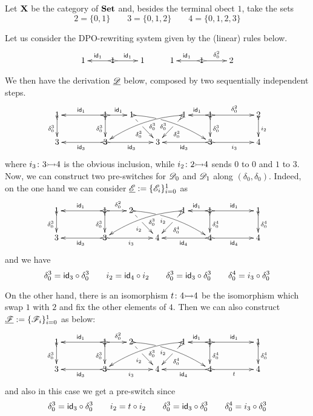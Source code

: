 \begin{example}\label{ex:abs}
	Let $\textbf {\textup{X}}$ be the category of $\textbf {\textup{Set}}$ and, besides the terminal obect $1$, take the sets
	\[2=\{0,1\} \qquad 3=\{0,1,2\} \qquad 4=\{0,1,2,3\}\]
	
Let us consider the DPO-rewriting system given by the (linear) rules below.
		\[\xymatrix{1 & 1\ar@{>->}[l]_{\id{1}} \ar@{>->}[r]^{\id{1}} & 1 & 1 & 1\ar@{>->}[r]^{\delta^2_0} \ar@{>->}[l]_{\id{1}} & 2}\]

We then have the derivation $\underline{\mathscr{D}}$ below, composed by two sequentially independent steps.
		\[\xymatrix@R=20pt@C=20pt{1 \ar@{>->}[d]_{\delta^3_0}&& 1
	\ar@{>->}[d]_{\delta^3_0}\ar@{>->}[ll]_{\id{1}} \ar@{>->}[r]^{\id{1}} & 1
	\ar@{>->}@/^.25cm/[drrr]|(.32)\hole_(.4){\delta^3_0}
	\ar[dr]|(.33)\hole_{\delta^3_0} && 1 \ar@{>->}@/_.25cm/[dlll]^(.4){\delta^3_0}
	\ar@{>->}[dl]|(.33)\hole^{\delta^3_0}& 1 \ar@{>->}[d]^{\delta^3_0}\ar@{>->}[l]_{\id{1}}
	\ar@{>->}[rr]^{\delta^2_0} && 2 \ar@{>->}[d]^{i_2}\\3 && \ar@{>->}[ll]^{\id{3}}
	3 \ar@{>->}[rr]_{\id{3}}&& 3 && \ar@{>->}[ll]^{\id{3}} 3
	\ar@{>->}[rr]_{i_3}&& 4}
\]
where $i_3\colon 3\mto 4$ is the obvious inclusion, while $i_2\colon 2\mto 4$ sends $0$ to $0$ and $1$ to $3$.	 Now, we can construct two pre-switches for $\mathscr{D}_0$ and $\mathscr{D}_1$ along $(\delta_0, \delta_0)$. Indeed, on the one hand we can consider  $\underline{\mathscr{E}}:=\{\mathscr{E}_i\}_{i=0}^1$ as
		\[\xymatrix@R=20pt@C=20pt{1 \ar@{>->}[d]_{\delta^3_0}&& 1
	\ar@{>->}[d]_{\delta^3_0}\ar@{>->}[ll]_{\id{1}} \ar@{>->}[r]^{\delta^2_0} & 2
	\ar@{>->}@/^.25cm/[drrr]|(.32)\hole_(.4){i_2}
	\ar[dr]|(.33)\hole_{i_2} && 1 \ar@{>->}@/_.25cm/[dlll]^(.4){\delta^3_0}
	\ar@{>->}[dl]|(.33)\hole^{\delta^4_0}& 1 \ar@{>->}[d]^{\delta^4_0}\ar@{>->}[l]_{\id{1}}
	\ar@{>->}[rr]^{\id{1}} && 1 \ar@{>->}[d]^{\delta^4_0}\\3 && \ar@{>->}[ll]^{\id{3}}
	3 \ar@{>->}[rr]_{i_{3}}&& 4 && \ar@{>->}[ll]^{\id{4}} 4
	\ar@{>->}[rr]_{\id{4}}&& 4}
\]
and we have
\[
\delta^3_0=\mathsf{id}_{3} \circ \delta^3_0
\qquad i_2=\mathsf{id}_{4} \circ i_2
\qquad \delta^3_0= \mathsf{id}_{3} \circ \delta^3_0
\qquad \delta^4_0= i_3\circ \delta^3_0\]

On the other hand, there is an isomorphism $t\colon 4\mto 4$ be the isomorphism which swap $1$ with $2$ and fix the other elements of $4$. Then we can also construct $\underline{\mathscr{F}}:=\{\mathscr{F}_i\}_{i=0}^1$ as below:
		\[\xymatrix@R=20pt@C=20pt{1 \ar@{>->}[d]_{\delta^3_0}&& 1
		\ar@{>->}[d]_{\delta^3_0}\ar@{>->}[ll]_{\id{1}} \ar@{>->}[r]^{\delta^2_0} & 2
		\ar@{>->}@/^.25cm/[drrr]|(.32)\hole_(.4){i_2}
		\ar[dr]|(.33)\hole_{i_2} && 1 \ar@{>->}@/_.25cm/[dlll]^(.4){\delta^3_0}
		\ar@{>->}[dl]|(.33)\hole^{\delta^4_0}& 1 \ar@{>->}[d]^{\delta^4_0}\ar@{>->}[l]_{\id{1}}
		\ar@{>->}[rr]^{\id{1}} && 1 \ar@{>->}[d]^{\delta^4_0}\\3 && \ar@{>->}[ll]^{\id{3}}
		3 \ar@{>->}[rr]_{i_{3}}&& 4 && \ar@{>->}[ll]^{\id{4}} 4
		\ar@{>->}[rr]_{t}&& 4}
	\]
	and also in this case we get a pre-switch since
	\[
	\delta^3_0=\mathsf{id}_{3} \circ \delta^3_0
	\qquad i_2=t\circ i_2
	\qquad \delta^3_0= \mathsf{id}_{3} \circ \delta^3_0
	\qquad \delta^4_0= i_3\circ \delta^3_0\]
	

\end{example}
